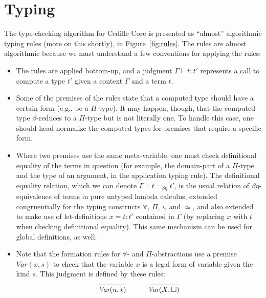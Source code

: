 \documentclass{article}
\begin{document}
\section{Typing}

The type-checking algorithm for Cedille Core is presented as ``almost'' algorithmic typing rules (more on this shortly),
in Figure~\ref{fig:rules}.  The rules are almost algorithmic because we must understand a few conventions for applying the rules:

\begin{itemize}
\item The rules are applied bottom-up, and a judgment $\Gamma\vdash t : t'$ represents a call to compute
  a type $t'$ given a context $\Gamma$ and a term $t$.
\item Some of the premises of the rules state that a computed type should have a certain form (e.g., be a $\Pi$-type).  It may happen, though, that the computed type $\beta$-reduces to a $\Pi$-type but is not literally one.  To handle this case, one should head-normalize the computed types for premises that require a specific form.
\item Where two premises use the same meta-variable, one must check definitional equality of the terms in question (for example, the domain-part of a $\Pi$-type and the type of an argument, in the application typing rule).
  The definitional equality relation, which we can denote $\Gamma \vdash t =_{\beta\eta} t'$,
  is the usual relation of $\beta\eta$-equivalence of
terms in pure untyped lambda calculus, extended congruentially for the
typing constructs $\forall$, $\Pi$, $\iota$, and $\simeq$, and also
extended to make use of let-definitions $x = t : t'$ contained in
$\Gamma$ (by replacing $x$ with $t$ when checking definitional
equality).  This same mechanism can be used for global definitions, as
well.
\item Note that the formation rules for $\forall$- and $\Pi$-abstractions use
  a premise $\textit{Var}(x,s)$ to check
  that the variable $x$ is a legal form of variable given the kind $s$.  This
  judgment is defined by these rules:
  \[
  \begin{array}{lll}
    \infer{\textit{Var}(u,\star)}{\ } & \ \ \ & \infer{\textit{Var}(X,\Box)}{\ }
  \end{array}
  \]
  
\end{itemize}
\end{document}

